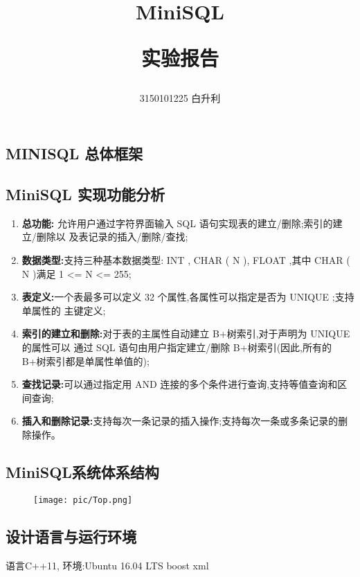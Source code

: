 \documentclass[10pt]{article}
\title{
MiniSQL \begin{CJK}{UTF8}{gbsn}实验报告\end{CJK}
}
\author{\begin{CJK}{UTF8}{gbsn}3150101225 白升利 \end{CJK}}
\begin{document}
	\maketitle
\begin{CJK}{UTF8}{gkai}
	\section{MINISQL 总体框架}
	\subsection{MiniSQL 实现功能分析}
	\begin{enumerate}
		\item \textbf{总功能:} 允许用户通过字符界面输入 SQL 语句实现表的建立/删除;索引的建立/删除以
		及表记录的插入/删除/查找;
		\item \textbf{数据类型:}支持三种基本数据类型: INT , CHAR ( N ), FLOAT ,其中 CHAR ( N )满足 1 <= N <=
		255;
		\item \textbf{表定义:}一个表最多可以定义 32 个属性,各属性可以指定是否为 UNIQUE ;支持单属性的
		主键定义;
		\item \textbf{索引的建立和删除:}对于表的主属性自动建立 B+树索引,对于声明为 UNIQUE 的属性可以
		通过 SQL 语句由用户指定建立/删除 B+树索引(因此,所有的 B+树索引都是单属性单值的);	
		\item \textbf{查找记录:}可以通过指定用 AND 连接的多个条件进行查询,支持等值查询和区间查询;
		\item \textbf{插入和删除记录:}支持每次一条记录的插入操作;支持每次一条或多条记录的删除操作。
	\end{enumerate}
	
	\subsection{MiniSQL系统体系结构}
	\begin{center}
		\begin{figure}[H]
			\texttt{[image: pic/Top.png]}
		\end{figure}
	\end{center}
	
	\subsection{设计语言与运行环境}
	语言C++11, 环境:Ubuntu 16.04 LTS
	boost xml
	

\end{CJK}
\end{document}
